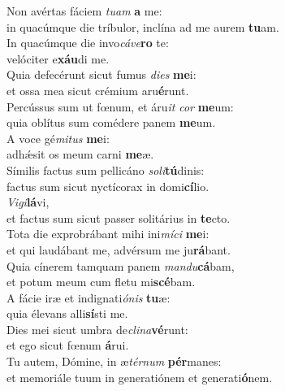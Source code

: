 \evenverse Non avértas fáciem \textit{tu}\textit{am} \textbf{a} me:~\*\\
\evenverse in quacúmque die tríbulor, inclína ad me aurem \textbf{tu}am.\\
\oddverse In quacúmque die invo\textit{cá}\textit{ve}\textbf{ro} te:~\*\\
\oddverse velóciter e\textbf{xáu}di me.\\
\evenverse Quia defecérunt sicut fumus \textit{di}\textit{es} \textbf{me}i:~\*\\
\evenverse et ossa mea sicut crémium aru\textbf{é}runt.\\
\oddverse Percússus sum ut fœnum, et áru\textit{it} \textit{cor} \textbf{me}um:~\*\\
\oddverse quia oblítus sum comédere panem \textbf{me}um.\\
\evenverse A voce gé\textit{mi}\textit{tus} \textbf{me}i:~\*\\
\evenverse adhǽsit os meum carni \textbf{me}æ.\\
\oddverse Símilis factus sum pellicáno \textit{so}\textit{li}\textbf{tú}dinis:~\*\\
\oddverse factus sum sicut nyctícorax in domi\textbf{cí}lio.\\
\evenverse \textit{Vi}\textit{gi}\textbf{lá}vi,~\*\\
\evenverse et factus sum sicut passer solitárius in \textbf{te}cto.\\
\oddverse Tota die exprobrábant mihi ini\textit{mí}\textit{ci} \textbf{me}i:~\*\\
\oddverse et qui laudábant me, advérsum me ju\textbf{rá}bant.\\
\evenverse Quia cínerem tamquam panem \textit{man}\textit{du}\textbf{cá}bam,~\*\\
\evenverse et potum meum cum fletu mi\textbf{scé}bam.\\
\oddverse A fácie iræ et indignati\textit{ó}\textit{nis} \textbf{tu}æ:~\*\\
\oddverse quia élevans alli\textbf{sí}sti me.\\
\evenverse Dies mei sicut umbra de\textit{cli}\textit{na}\textbf{vé}runt:~\*\\
\evenverse et ego sicut fœnum \textbf{á}rui.\\
\oddverse Tu autem, Dómine, in æ\textit{tér}\textit{num} \textbf{pér}manes:~\*\\
\oddverse et memoriále tuum in generatiónem et generati\textbf{ó}nem.\\
